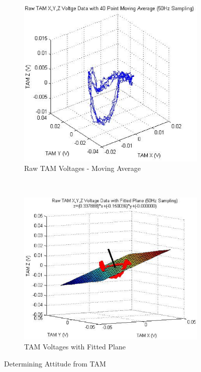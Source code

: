 \begin{figure}
  \begin{subfigure}[h!]{0.5\textwidth}
    \includegraphics[width=\textwidth]{figures/tam_moving_average.eps}
    \caption{Raw TAM Voltages - Moving Average}
    \label{fig:TAMMovingAverage}
  \end{subfigure}
  ~
  \begin{subfigure}[h!]{0.5\textwidth}
    \includegraphics[width=\textwidth]{figures/tam_fitted_plane.eps}
    \caption{TAM Voltages with Fitted Plane}
    \label{fig:TAMFittedPlane}
  \end{subfigure}
  \caption{Determining Attitude from TAM}
  \label{fig:TAMSignal}
\end{figure}

